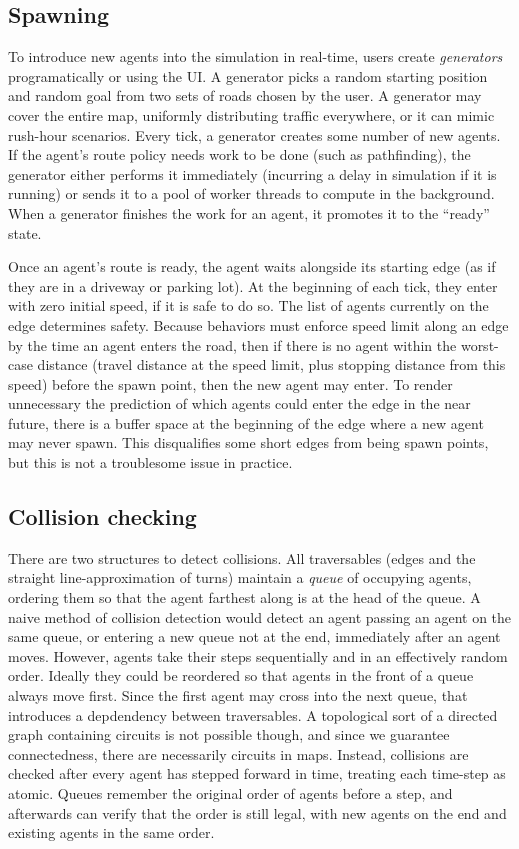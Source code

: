\documentclass[letterpaper, 10 pt, conference]{ieeeconf}  %
\begin{document}
\subsection{Spawning}

To introduce new agents into the simulation in real-time, users create
\emph{generators} programatically or using the UI. A generator picks a random
starting position and random goal from two sets of roads chosen by the user. A
generator may cover the entire map, uniformly distributing traffic everywhere,
or it can mimic rush-hour scenarios. Every tick, a generator creates some number
of new agents.  If the agent's route policy needs work to be done (such as
pathfinding), the generator either performs it immediately (incurring a delay in
simulation if it is running) or sends it to a pool of worker threads to compute
in the background. When a generator finishes the work for an agent, it promotes
it to the ``ready'' state.

Once an agent's route is ready, the agent waits alongside its starting edge (as
if they are in a driveway or parking lot). At the beginning of each tick, they
enter with zero initial speed, if it is safe to do so. The list of agents
currently on the edge determines safety. Because behaviors must enforce speed
limit along an edge by the time an agent enters the road, then if there is no
agent within the worst-case distance (travel distance at the speed limit, plus
stopping distance from this speed) before the spawn point, then the new agent
may enter. To render unnecessary the prediction of which agents could enter the
edge in the near future, there is a buffer space at the beginning of the edge
where a new agent may never spawn. This disqualifies some short edges from being
spawn points, but this is not a troublesome issue in practice.

\subsection{Collision checking}

There are two structures to detect collisions. All traversables (edges and the
straight line-approximation of turns) maintain a \emph{queue} of occupying
agents, ordering them so that the agent farthest along is at the head of the
queue. A naive method of collision detection would detect an agent passing an
agent on the same queue, or entering a new queue not at the end, immediately
after an agent moves. However, agents take their steps sequentially and in an
effectively random order. Ideally they could be reordered so that agents in the
front of a queue always move first. Since the first agent may cross into the
next queue, that introduces a depdendency between traversables. A topological
sort of a directed graph containing circuits is not possible though, and since
we guarantee connectedness, there are necessarily circuits in maps.  Instead,
collisions are checked after every agent has stepped forward in time, treating
each time-step as atomic. Queues remember the original order of agents before a
step, and afterwards can verify that the order is still legal, with new agents
on the end and existing agents in the same order.
\end{document}

